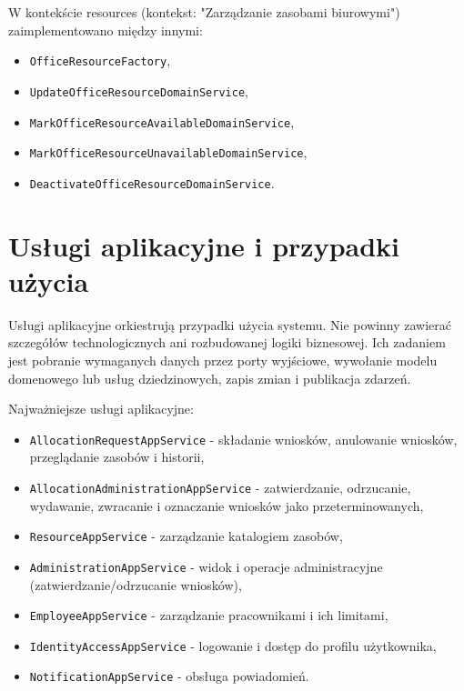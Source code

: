 W kontekście resources (kontekst: "Zarządzanie zasobami biurowymi") zaimplementowano między innymi:
\begin{itemize}
    \item \texttt{OfficeResourceFactory},
    \item \texttt{UpdateOfficeResourceDomainService},
    \item \texttt{MarkOfficeResourceAvailableDomainService},
    \item \texttt{MarkOfficeResourceUnavailableDomainService},
    \item \texttt{DeactivateOfficeResourceDomainService}.
\end{itemize}

\section{Usługi aplikacyjne i przypadki użycia}

Usługi aplikacyjne orkiestrują przypadki użycia systemu. Nie powinny zawierać szczegółów technologicznych ani rozbudowanej logiki biznesowej. Ich zadaniem jest pobranie wymaganych danych przez porty wyjściowe, wywołanie modelu domenowego lub usług dziedzinowych, zapis zmian i publikacja zdarzeń.

Najważniejsze usługi aplikacyjne:
\begin{itemize}
    \item \texttt{AllocationRequestAppService} - składanie wniosków, anulowanie wniosków, przeglądanie zasobów i historii,
    \item \texttt{AllocationAdministrationAppService} - zatwierdzanie, odrzucanie, wydawanie, zwracanie i oznaczanie wniosków jako przeterminowanych,
    \item \texttt{ResourceAppService} - zarządzanie katalogiem zasobów,
    \item \texttt{AdministrationAppService} - widok i operacje administracyjne (zatwierdzanie/odrzucanie wniosków),
    \item \texttt{EmployeeAppService} - zarządzanie pracownikami i ich limitami,
    \item \texttt{IdentityAccessAppService} - logowanie i dostęp do profilu użytkownika,
    \item \texttt{NotificationAppService} - obsługa powiadomień.
\end{itemize}

